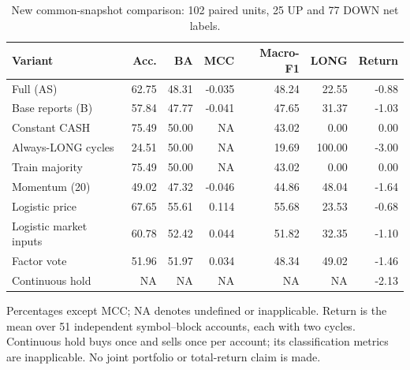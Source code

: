 \begin{table}[htbp]
\centering\small
\caption{New common-snapshot comparison: 102 paired units, 25 UP and 77 DOWN net labels.}
\label{tab:r1_common_metrics}
\setlength{\tabcolsep}{3.5pt}
\begin{tabular}{lrrrrrr}
\hline
Variant & Acc. & BA & MCC & Macro-F1 & LONG & Return \\
\hline
Full (AS) & 62.75 & 48.31 & -0.035 & 48.24 & 22.55 & -0.88 \\
Base reports (B) & 57.84 & 47.77 & -0.041 & 47.65 & 31.37 & -1.03 \\
Constant CASH & 75.49 & 50.00 & NA & 43.02 & 0.00 & 0.00 \\
Always-LONG cycles & 24.51 & 50.00 & NA & 19.69 & 100.00 & -3.00 \\
Train majority & 75.49 & 50.00 & NA & 43.02 & 0.00 & 0.00 \\
Momentum (20) & 49.02 & 47.32 & -0.046 & 44.86 & 48.04 & -1.64 \\
Logistic price & 67.65 & 55.61 & 0.114 & 55.68 & 23.53 & -0.68 \\
Logistic market inputs & 60.78 & 52.42 & 0.044 & 51.82 & 32.35 & -1.10 \\
Factor vote & 51.96 & 51.97 & 0.034 & 48.34 & 49.02 & -1.46 \\
Continuous hold & NA & NA & NA & NA & NA & -2.13 \\
\hline
\end{tabular}
\par\smallskip\footnotesize Percentages except MCC; NA denotes undefined or inapplicable. Return is the mean over 51 independent symbol--block accounts, each with two cycles. Continuous hold buys once and sells once per account; its classification metrics are inapplicable. No joint portfolio or total-return claim is made.
\end{table}
